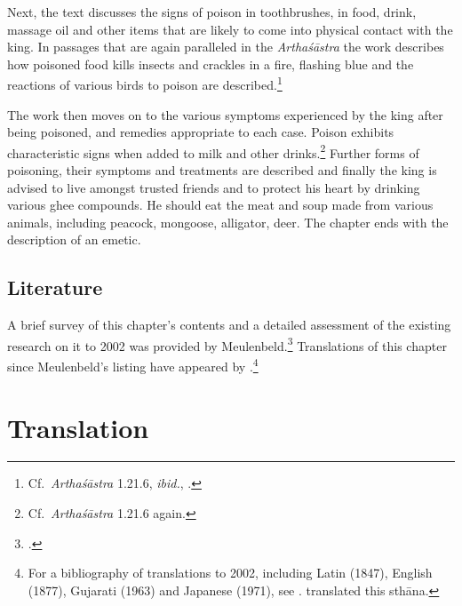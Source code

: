 Next, the text discusses the signs of poison in toothbrushes, in food, drink,
massage oil and other items that are likely to come into physical contact with the
king.  In passages that are again paralleled in the \emph{Arthaśāstra} the work
describes how poisoned food kills insects and crackles in a fire, flashing blue
and  the reactions of various birds to poison are described.\footnote{Cf.\
\emph{Arthaśāstra} 1.21.6, \emph{ibid.}, \citet[96]{oliv-2013}.}


The work then moves on to the various symptoms experienced by the king after 
being poisoned, and remedies appropriate to each case.  Poison exhibits 
characteristic signs when added to milk and other drinks.\footnote{Cf.\
\emph{Arthaśāstra} 1.21.6 again.} Further forms of poisoning, their symptoms 
and treatments are described  and finally the king is advised to live amongst 
trusted friends and to protect his heart by drinking various ghee compounds.  He 
should eat the meat and soup made from various animals, including peacock, 
mongoose, alligator, deer.  The chapter ends with the description of an emetic.

\subsection{Literature}

A brief survey of this chapter's contents and a detailed assessment of
the existing research on it to 2002 was provided by
Meulenbeld.\footcite[IA, 289--290]{meul-hist} Translations of this
chapter since Meulenbeld's listing have appeared by
\textcites[131--139]{wuja-2003}[3,
1--15]{shar-1999}{srik-2002}.\footnote{For a bibliography of translations
    to 2002, including Latin (1847), English (1877), Gujarati (1963) and
    Japanese (1971), see \cite[IB, 314--315]{meul-hist}. \citet{sing-1976} 
    translated this sthāna.}



\section{Translation}

